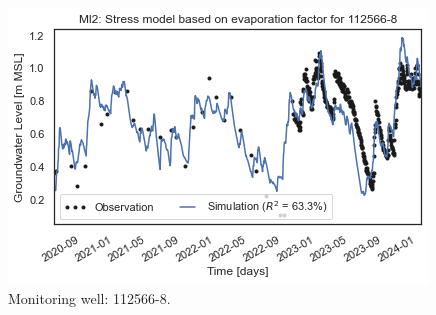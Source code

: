 \begin{figure}[htbp]
\begin{minipage}{0.32\textwidth}
        \includegraphics[width=\linewidth]{frontmatter/Rozenburg-fig/1125668(2).png}
        \caption{Monitoring well: 112566-8.}
        \label{fig:112566-8}
    \end{minipage}
\end{figure}
